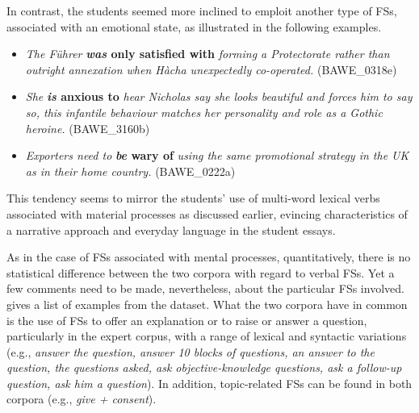\documentclass[output=paper]{langsci/langscibook}
\begin{document}
In contrast, the students seemed more inclined to emploit another type of FSs, associated with an emotional state, as illustrated in the following examples. 

\begin{itemize}
\item \begin{styleListParagraph}
\textit{The Führer} \textbf{\textit{was} \textbf{only} \textbf{satisfied} \textbf{with}} \textit{forming a Protectorate rather than outright annexation when Hàcha unexpectedly co-operated.} (BAWE\_0318e)
\end{styleListParagraph}
\item \begin{styleListParagraph}
\textit{She} \textbf{\textit{is} \textbf{anxious} \textbf{to}} \textit{hear Nicholas say she looks beautiful and forces him to say so, this infantile behaviour matches her personality and role as a Gothic heroine.} (BAWE\_3160b)
\end{styleListParagraph}
\item \begin{styleListParagraph}
\textit{Exporters need to} \textbf{\textit{be} \textbf{wary} \textbf{of}} \textit{using the same promotional strategy in the UK as in their home country.} (BAWE\_0222a)
\end{styleListParagraph}
\end{itemize}

This tendency seems to mirror the students’ use of multi-word lexical verbs associated with material processes as discussed earlier, evincing characteristics of a narrative approach and everyday language in the student essays.

As in the case of FSs associated with mental processes, quantitatively, there is no statistical difference between the two corpora with regard to verbal FSs. Yet a few comments need to be made, nevertheless, about the particular FSs involved.  gives a list of examples from the dataset. What the two corpora have in common is the use of FSs to offer an explanation or to raise or answer a question, particularly in the expert corpus, with a range of lexical and syntactic variations (e.g., \textit{answer the question, answer 10 blocks of questions, an answer to the question, the questions asked, ask objective-knowledge questions, ask a follow-up question, ask him a question}). In addition, topic-related FSs can be found in both corpora (e.g., \textit{give + consent}). 
\end{document}
